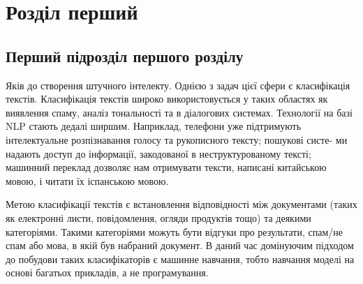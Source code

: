 \documentclass[a4paper,14pt]{extreport}
\begin{document}
\chapter{Розділ перший}

\section{Перший підрозділ першого розділу}

Яків до створення штучного інтелекту. Однією з задач цієї сфери є класифікація
текстів. Класифікація текстів широко використовується у таких областях
як виявлення спаму, аналіз тональності та в діалогових системах. Технології
на базі NLP стають дедалі ширшим. Наприклад, телефони уже підтримують
інтелектуальне розпізнавання голосу та рукописного тексту; пошукові систе-
ми надають доступ до інформації, закодованої в неструктурованому тексті;
машинний переклад дозволяє нам отримувати тексти, написані китайською
мовою, і читати їх іспанською мовою.

Метою класифікації текстів є встановлення відповідності між документами
(таких як електронні листи, повідомлення, огляди продуктів тощо) та
деякими категоріями. Такими категоріями можуть бути відгуки про результати,
спам/не спам або мова, в якій був набраний документ. В даний час
домінуючим підходом до побудови таких класифікаторів є машинне навчання,
тобто навчання моделі на основі багатьох прикладів, а не програмування.

\tableofcontents
\end{document}
